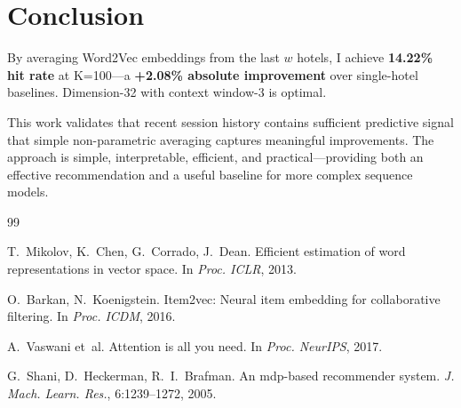 \documentclass[sigconf]{acmart}
\begin{document}
\section{Conclusion}

By averaging Word2Vec embeddings from the last $w$ hotels, I achieve \textbf{14.22\% hit rate} at K=100—a \textbf{+2.08\% absolute improvement} over single-hotel baselines. Dimension-32 with context window-3 is optimal. 

This work validates that recent session history contains sufficient predictive signal that simple non-parametric averaging captures meaningful improvements. The approach is simple, interpretable, efficient, and practical—providing both an effective recommendation and a useful baseline for more complex sequence models.

\begin{thebibliography}{99}

T.~Mikolov, K.~Chen, G.~Corrado, J.~Dean.
\newblock Efficient estimation of word representations in vector space.
\newblock In \textit{Proc. ICLR}, 2013.

O.~Barkan, N.~Koenigstein.
\newblock Item2vec: Neural item embedding for collaborative filtering.
\newblock In \textit{Proc. ICDM}, 2016.

A.~Vaswani et~al.
\newblock Attention is all you need.
\newblock In \textit{Proc. NeurIPS}, 2017.

G.~Shani, D.~Heckerman, R.~I.~Brafman.
\newblock An mdp-based recommender system.
\newblock \textit{J. Mach. Learn. Res.}, 6:1239--1272, 2005.

\end{thebibliography}
\end{document}
